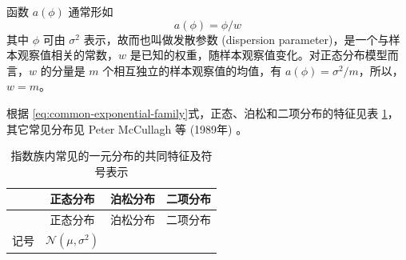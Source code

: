 \documentclass[12pt,a4paper,UTF8,twoside]{book}
\theoremstyle{definition}
\theoremstyle{definition}
\theoremstyle{definition}
\theoremstyle{remark}
\begin{document}
函数 \(a(\phi)\) 通常形如 \[ a(\phi) = \phi/w \] \noindent 其中 \(\phi\)
可由 \(\sigma^2\) 表示，故而也叫做发散参数 (dispersion
parameter)，是一个与样本观察值相关的常数，\(w\)
是已知的权重，随样本观察值变化。对正态分布模型而言，\(w\) 的分量是 \(m\)
个相互独立的样本观察值的均值，有
\(a(\phi) = \sigma^2/m\)，所以，\(w = m\)。

根据
\eqref{eq:common-exponential-family}式，正态、泊松和二项分布的特征见表
\ref{tab:common-characteristics}，其它常见分布见 Peter McCullagh 等
(1989年) \citep{McCullagh1989}。

\begin{longtable}[]{@{}lccc@{}}
\caption[\label{tab:common-characteristics}
指数族内常见的一元分布的共同特征及符号表示]{\label{tab:common-characteristics}
指数族内常见的一元分布的共同特征及符号表示\footnotemark{}}\tabularnewline
\toprule
\begin{minipage}[b]{0.21\columnwidth}\raggedright
\strut
\end{minipage} & \begin{minipage}[b]{0.22\columnwidth}\centering
正态分布\strut
\end{minipage} & \begin{minipage}[b]{0.22\columnwidth}\centering
泊松分布\strut
\end{minipage} & \begin{minipage}[b]{0.22\columnwidth}\centering
二项分布\strut
\end{minipage}\tabularnewline
\midrule
\endfirsthead
\toprule
\begin{minipage}[b]{0.21\columnwidth}\raggedright
\strut
\end{minipage} & \begin{minipage}[b]{0.22\columnwidth}\centering
正态分布\strut
\end{minipage} & \begin{minipage}[b]{0.22\columnwidth}\centering
泊松分布\strut
\end{minipage} & \begin{minipage}[b]{0.22\columnwidth}\centering
二项分布\strut
\end{minipage}\tabularnewline
\midrule
\endhead
\begin{minipage}[t]{0.21\columnwidth}\raggedright
记号\strut
\end{minipage} & \begin{minipage}[t]{0.22\columnwidth}\centering
\(\mathcal{N}(\mu,\sigma^2)\)\strut
\end{minipage} & \begin{minipage}[t]{0.22\columnwidth}\centering

\end{minipage}
\end{longtable}
\end{document}
